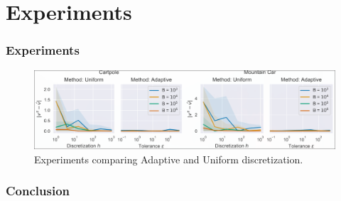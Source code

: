 \documentclass{beamer}
\begin{document}
\section*{Experiments}
\begin{frame}
	\frametitle{Experiments}
  \begin{figure}[ht]
    \centering
    \includegraphics[width=\textwidth]{./imgs/experiments.png} %
    \caption{Experiments comparing Adaptive and Uniform discretization.}
  \end{figure}
\end{frame}

\begin{frame}
	\frametitle{Conclusion}
\end{frame}
\end{document}
